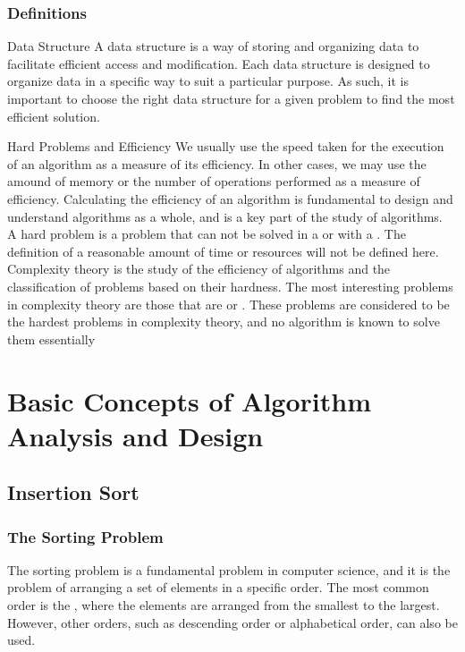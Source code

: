 \documentclass[openany]{book}
\begin{document}
\subsection{Definitions}
\begin{mydefinition}{Data Structure}
    A data structure is a way of storing and organizing data to facilitate efficient access and modification. Each data structure is designed to organize data in a specific way to suit a particular purpose. As such, it is important to choose the right data structure for a given problem to find the most efficient solution. 
\end{mydefinition}
\begin{mydefinition}{Hard Problems and Efficiency}
    We usually use the speed taken for the execution of an algorithm as a measure of its efficiency. In other cases, we may use the amound of memory or the number of operations performed as a measure of efficiency. Calculating the efficiency of an algorithm is fundamental to design and understand algorithms as a whole, and is a key part of the study of algorithms. \\
    A hard problem is a problem that can not be solved in a  or with a . The definition of a reasonable amount of time or resources will not be defined here. Complexity theory is the study of the efficiency of algorithms and the classification of problems based on their hardness. The most interesting problems in complexity theory are those that are  or . These problems are considered to be the hardest problems in complexity theory, and no algorithm is known to solve them essentially
\end{mydefinition}
\chapter{Basic Concepts of Algorithm Analysis and Design}
\section{Insertion Sort}
\subsection{The Sorting Problem}
The sorting problem is a fundamental problem in computer science, and it is the problem of arranging a set of elements in a specific order. The most common order is the , where the elements are arranged from the smallest to the largest. However, other orders, such as descending order or alphabetical order, can also be used. \\  
\end{document}
